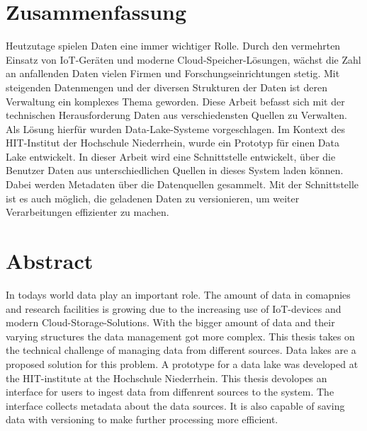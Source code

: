 \section*{Zusammenfassung}

Heutzutage spielen Daten eine immer wichtiger Rolle.
Durch den vermehrten Einsatz von IoT-Geräten und moderne Cloud-Speicher-Lösungen, wächst die Zahl an anfallenden Daten vielen Firmen und Forschungseinrichtungen stetig.
Mit steigenden Datenmengen und der diversen Strukturen der Daten ist deren Verwaltung ein komplexes Thema geworden.
Diese Arbeit befasst sich mit der technischen Herausforderung Daten aus verschiedensten Quellen zu Verwalten.
Als Lösung hierfür wurden Data-Lake-Systeme vorgeschlagen.
Im Kontext des HIT-Institut der Hochschule Niederrhein, wurde ein Prototyp für einen Data Lake entwickelt.
In dieser Arbeit wird eine Schnittstelle entwickelt, über die Benutzer Daten aus unterschiedlichen Quellen in dieses System laden können.
Dabei werden Metadaten über die Datenquellen gesammelt.
Mit der Schnittstelle ist es auch möglich, die geladenen Daten zu versionieren, um weiter Verarbeitungen effizienter zu machen.

\section*{Abstract}

In todays world data play an important role.
The amount of data in comapnies and research facilities is growing due to the increasing use of IoT-devices and modern Cloud-Storage-Solutions.
With the bigger amount of data and their varying structures the data management got more complex.
This thesis takes on the technical challenge of managing data from different sources.
Data lakes are a proposed solution for this problem.
A prototype for a data lake was developed at the HIT-institute at the Hochschule Niederrhein.
This thesis devolopes an interface for users to ingest data from diffenrent sources to the system.
The interface collects metadata about the data sources.
It is also capable of saving data with versioning to make further processing more efficient.